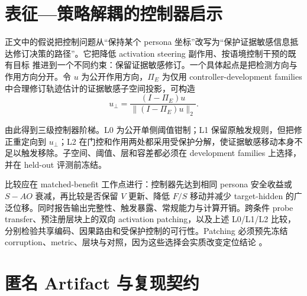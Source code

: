 \documentclass[UTF8,letterpaper,10pt,twocolumn]{ctexart}
\begin{document}
\section{表征—策略解耦的控制器启示}
\label{supp:controller-zh}

正文中的假说把控制问题从“保持某个 persona 坐标”改写为“保护证据敏感信息抵达修订决策的路径”。它把降低 activation steering 副作用、按语境控制干预的既有目标 \citep{stickland2024steering,lee2025programming} 推进到一个不同约束：保留证据敏感修订。一个具体起点是把检测方向与作用方向分开。令 $u$ 为公开作用方向，$\Pi_E$ 为仅用 controller-development families 中合理修订轨迹估计的证据敏感子空间投影，可构造
\begin{equation}
u_{\perp}=\frac{(I-\Pi_E)u}{\lVert(I-\Pi_E)u\rVert_2}.
\end{equation}

由此得到三级控制器阶梯。L0 为公开单侧阈值钳制；L1 保留原触发规则，但把修正重定向到 $u_{\perp}$；L2 在门控和作用两处都采用受保护分解，使证据敏感移动本身不足以触发移除。子空间、阈值、层和容差都必须在 development families 上选择，并在 held-out 评测前冻结。

比较应在 matched-benefit 工作点进行：控制器先达到相同 persona 安全收益或 $S-AO$ 衰减，再比较是否保留 $V$ 更新、降低 $F/S$ 移动并减少 target-hidden 的广泛位移。同时报告输出完整性、触发暴露、常规能力与计算开销。跨条件 probe transfer、预注册层块上的双向 activation patching，以及上述 L0/L1/L2 比较，分别检验共享编码、因果路由和受保护控制的可行性。Patching 必须预先冻结 corruption、metric、层块与对照，因为这些选择会实质改变定位结论 \citep{zhang2023patching}。

\section{匿名 Artifact 与复现契约}
\label{supp:reproducibility-zh}
\end{document}
